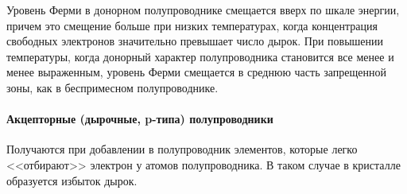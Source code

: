 Уровень Ферми в донорном полупроводнике смещается вверх по шкале энергии, причем это смещение больше при низких температурах, когда концентрация свободных электронов значительно превышает число дырок. При повышении температуры, когда донорный характер полупроводника становится все менее и менее выраженным, уровень Ферми смещается в среднюю часть запрещенной зоны, как в беспримесном полупроводнике.
	
\paragraph{Акцепторные (дырочные, p-типа) полупроводники}
Получаются при добавлении в полупроводник элементов, которые легко <<отбирают>> электрон у атомов полупроводника. 
В таком случае в кристалле образуется избыток дырок.

